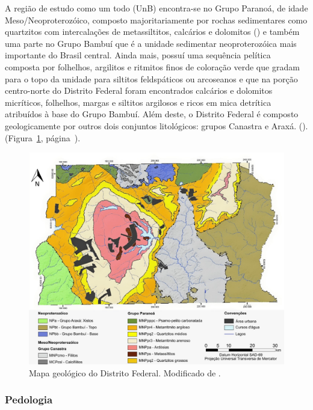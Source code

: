 \documentclass[a4paper, 12 pt]{article} %
\begin{document}
A região de estudo como um todo (UnB) encontra-se no Grupo Paranoá, de idade Meso/Neoproterozóico, composto majoritariamente por rochas sedimentares como quartzitos com intercalações de metassiltitos, calcários e dolomitos (\citealp{pimentel2011tectonic}) e também uma parte no Grupo Bambuí que é a unidade sedimentar neoproterozóica mais importante do Brasil central. Ainda mais, possuí uma sequência pelítica composta por folhelhos, argilitos e ritmitos finos de coloração verde que gradam para o topo da unidade para siltitos feldspáticos ou arcoseanos e que na porção centro-norte do Distrito Federal foram encontrados calcários e dolomitos micríticos, folhelhos, margas e siltitos argilosos e ricos em mica detrítica atribuídos à base do Grupo Bambuí. Além deste, o Distrito Federal é composto geologicamente por outros dois conjuntos litológicos: grupos Canastra e Araxá. (\citealp{campos2004hidrogeologia}). (Figura~\ref{geologia}, página~\pageref{geologia}).


\begin{figure}[!hbtp]
	\begin{center}
		\includegraphics[scale=0.37]{Figuras/geologia.jpeg}
	\end{center}
	\caption{Mapa geológico do Distrito Federal. Modificado de \cite{neumann2012mapeamento}.}
	\label{geologia}
\end{figure} \newpage

\subsubsection{Pedologia}
\end{document}
